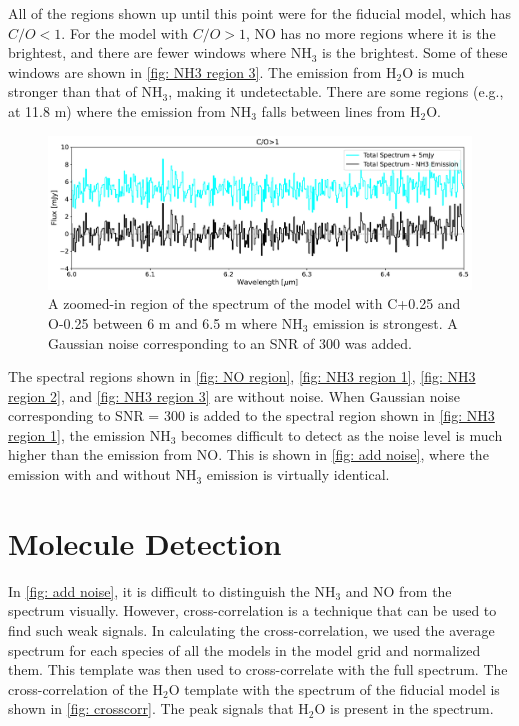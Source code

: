 \documentclass[oneside, single, authoryear, semicolon, 12pt]{lion-msc}
\newcommand{\4}{$_4$}
\newcommand{\3}{$_3$}
\newcommand{\2}{$_2$}
\begin{document}
All of the regions shown up until this point were for the fiducial model, which has $C/O<1$. For the model with $C/O>1$, NO has no more regions where it is the brightest, and there are fewer windows where NH\3 is the brightest. Some of these windows are shown in \autoref{fig: NH3 region 3}. The emission from H\2O is much stronger than that of NH\3, making it undetectable. There are some regions (e.g., at 11.8 \textmu m) where the emission from NH\3 falls between lines from H\2O. 

\begin{figure}[H]
    \centering
    \includegraphics[width=\linewidth]{Figures/AddNoise.pdf}
    \caption{A zoomed-in region of the spectrum of the model with C+0.25 and O-0.25 between 6 \textmu m and 6.5 \textmu m where NH\3 emission is strongest. A Gaussian noise corresponding to an SNR of 300 was added.}
    \label{fig: add noise}
\end{figure}

The spectral regions shown in \autoref{fig: NO region}, \autoref{fig: NH3 region 1}, \autoref{fig: NH3 region 2}, and \autoref{fig: NH3 region 3} are without noise. When Gaussian noise corresponding to SNR = 300 is added to the spectral region shown in \autoref{fig: NH3 region 1}, the emission NH\3 becomes difficult to detect as the noise level is much higher than the emission from NO. This is shown in  \autoref{fig: add noise}, where the emission with and without NH\3 emission is virtually identical.

\section{Molecule Detection}
In \autoref{fig: add noise}, it is difficult to distinguish the NH\3 and NO from the spectrum visually. However, cross-correlation is a technique that can be used to find such weak signals. In calculating the cross-correlation, we used the average spectrum for each species of all the models in the model grid and normalized them. This template was then used to cross-correlate with the full spectrum. The cross-correlation of the H\2O template with the spectrum of the fiducial model is shown in \autoref{fig: crosscorr}. The peak signals that H\2O is present in the spectrum. 
\end{document}
